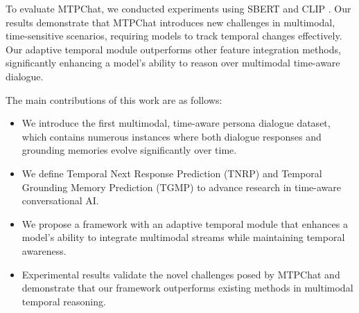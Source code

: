 To evaluate MTPChat, we conducted experiments using SBERT \cite{reimers2019sentence} and CLIP \cite{radford2021learning}. Our results demonstrate that MTPChat introduces new challenges in multimodal, time-sensitive scenarios, requiring models to track temporal changes effectively.
Our adaptive temporal module outperforms other feature integration methods, significantly enhancing a model’s ability to reason over multimodal time-aware dialogue.


The main contributions of this work are as follows:
 \begin{itemize}
 
    \item We introduce the first multimodal, time-aware persona dialogue dataset, which contains numerous instances where both dialogue responses and grounding memories evolve significantly over time.
 
    \item We define Temporal Next Response Prediction (TNRP) and Temporal Grounding Memory Prediction (TGMP) to advance research in time-aware conversational AI.

    \item We propose a framework with an adaptive temporal module that enhances a model’s ability to integrate multimodal streams while maintaining temporal awareness.
  
    \item Experimental results validate the novel challenges posed by MTPChat and demonstrate that our framework outperforms existing methods in multimodal temporal reasoning.

\end{itemize}

